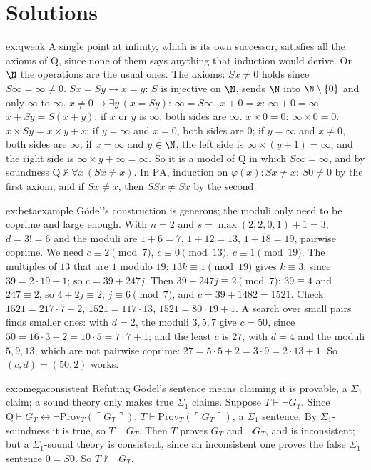 \section{Solutions}

\begin{solution}{ex:qweak}
\idea A single point at infinity, which is its own successor, satisfies all the axioms of $\mathrm Q$, since none of them says anything that induction would derive.
\writeup On $\N$ the operations are the usual ones. The axioms: $Sx\ne0$ holds since $S\infty=\infty\ne0$. $Sx=Sy\to x=y$: $S$ is injective on $\N$, sends $\N$ into $\N\setminus\{0\}$ and only $\infty$ to $\infty$. $x\ne0\to\exists y\,(x=Sy)$: $\infty=S\infty$. $x+0=x$: $\infty+0=\infty$. $x+Sy=S(x+y)$: if $x$ or $y$ is $\infty$, both sides are $\infty$. $x\times0=0$: $\infty\times0=0$. $x\times Sy=x\times y+x$: if $y=\infty$ and $x=0$, both sides are $0$; if $y=\infty$ and $x\ne0$, both sides are $\infty$; if $x=\infty$ and $y\in\N$, the left side is $\infty\times(y+1)=\infty$, and the right side is $\infty\times y+\infty=\infty$. So it is a model of $\mathrm Q$ in which $S\infty=\infty$, and by soundness $\mathrm Q\nvdash\forall x\,(Sx\ne x)$. In $\mathrm{PA}$, induction on $\varphi(x):Sx\ne x$: $S0\ne0$ by the first axiom, and if $Sx\ne x$, then $SSx\ne Sx$ by the second.
\end{solution}

\begin{solution}{ex:betaexample}
\idea Gödel's construction is generous; the moduli only need to be coprime and large enough.
\writeup With $n=2$ and $s=\max(2,2,0,1)+1=3$, $d=3!=6$ and the moduli are $1+6=7$, $1+12=13$, $1+18=19$, pairwise coprime. We need $c\equiv2\pmod7$, $c\equiv0\pmod{13}$, $c\equiv1\pmod{19}$. The multiples of $13$ that are $1$ modulo $19$: $13k\equiv1\pmod{19}$ gives $k\equiv3$, since $39=2\cdot19+1$; so $c=39+247j$. Then $39+247j\equiv2\pmod7$: $39\equiv4$ and $247\equiv2$, so $4+2j\equiv2$, $j\equiv6\pmod 7$, and $c=39+1482=1521$. Check: $1521=217\cdot7+2$, $1521=117\cdot13$, $1521=80\cdot19+1$. A search over small pairs finds smaller ones: with $d=2$, the moduli $3,5,7$ give $c=50$, since $50=16\cdot3+2=10\cdot5=7\cdot7+1$; and the least $c$ is $27$, with $d=4$ and the moduli $5,9,13$, which are not pairwise coprime: $27=5\cdot5+2=3\cdot9=2\cdot13+1$. So $(c,d)=(50,2)$ works.
\end{solution}

\begin{solution}{ex:omegaconsistent}
\idea Refuting Gödel's sentence means claiming it is provable, a $\Sigma_1$ claim; a sound theory only makes true $\Sigma_1$ claims.
\writeup Suppose $T\vdash\neg G_T$. Since $\mathrm Q\vdash G_T\leftrightarrow\neg\mathrm{Prov}_T(\ulcorner G_T\urcorner)$, $T\vdash\mathrm{Prov}_T(\ulcorner G_T\urcorner)$, a $\Sigma_1$ sentence. By $\Sigma_1$-soundness it is true, so $T\vdash G_T$. Then $T$ proves $G_T$ and $\neg G_T$, and is inconsistent; but a $\Sigma_1$-sound theory is consistent, since an inconsistent one proves the false $\Sigma_1$ sentence $0=S0$. So $T\nvdash\neg G_T$.
\end{solution}

